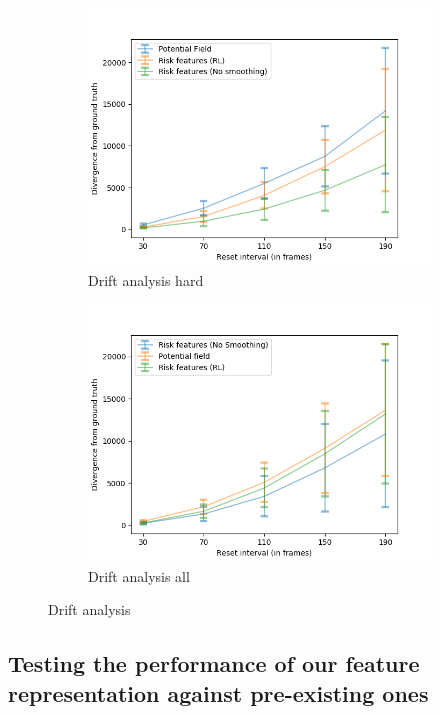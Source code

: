 \begin{figure}[htbp]
\begin{subfigure}{0.5\textwidth}
		\includegraphics[width=\linewidth]{plots/inter_method/drift_analysis_hard.png}
		\caption {Drift analysis hard}
		\label{fig:inter_method-drift_analysis_hard}
	\end{subfigure}
	\begin{subfigure}{0.5\textwidth}
		\centering
		\includegraphics[width=\linewidth]{plots/inter_method/drift_analysis_all.png}
		\caption {Drift analysis all}
		\label{fig:inter_method-drift_analysis_all}
	\end{subfigure}
	\caption{Drift analysis}
\end{figure}


\subsection*{Testing the performance of our feature representation against pre-existing ones}
